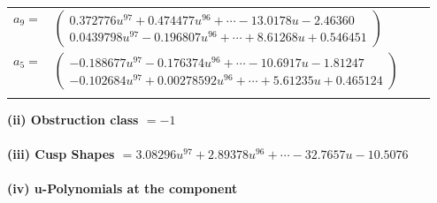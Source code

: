 \documentclass[1p]{elsarticle_modified}
\theoremstyle{definition}
\begin{document}
\begin{tabular}{m{7pt} m{180pt} m{7pt} m{180pt} }
\flushright $a_{9}=$&$\begin{pmatrix}0.372776 u^{97}+0.474477 u^{96}+\cdots-13.0178 u-2.46360\\0.0439798 u^{97}-0.196807 u^{96}+\cdots+8.61268 u+0.546451\end{pmatrix}$ \\
\flushright $a_{5}=$&$\begin{pmatrix}-0.188677 u^{97}-0.176374 u^{96}+\cdots-10.6917 u-1.81247\\-0.102684 u^{97}+0.00278592 u^{96}+\cdots+5.61235 u+0.465124\end{pmatrix}$\\&\end{tabular}
\flushleft \textbf{(ii) Obstruction class $= -1$}\\~\\
\flushleft \textbf{(iii) Cusp Shapes $= 3.08296 u^{97}+2.89378 u^{96}+\cdots-32.7657 u-10.5076$}\\~\\
\newpage\renewcommand{\arraystretch}{1}
\flushleft \textbf{(iv) u-Polynomials at the component}\newline \\
\end{document}
